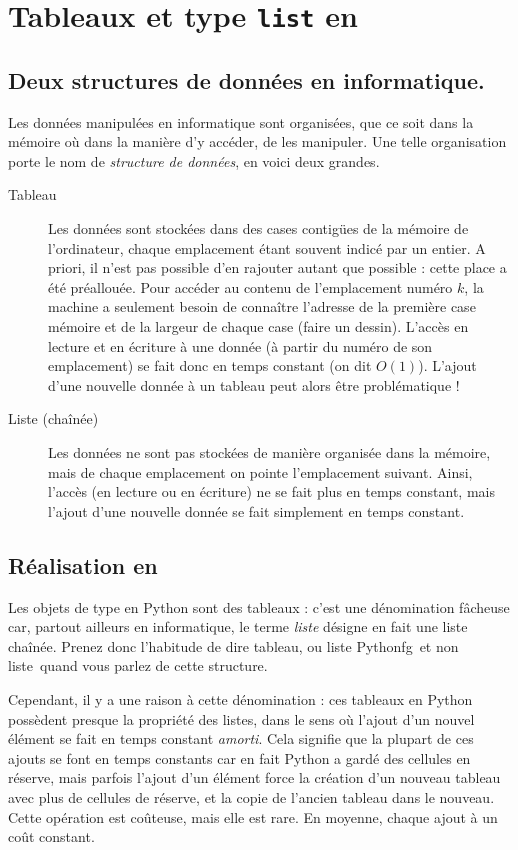 
\section{Tableaux et type \texttt{list} en \python}

\subsection{Deux structures de données en informatique.}

Les données manipulées en informatique sont organisées, que ce soit dans la mémoire où dans la manière d'y accéder, de les manipuler. 
Une telle organisation porte le nom de \emph{structure de données}, en voici deux grandes.  

\begin{description}
  \item[Tableau] Les données sont stockées dans des cases contigües de la mémoire de l'ordinateur, chaque emplacement étant souvent indicé par un entier. 
    A priori, il n'est pas possible d'en rajouter autant que possible : cette place a été préallouée. 
    Pour accéder au contenu de l'emplacement numéro $k$, la machine a seulement besoin de connaître 
l'adresse de la première case mémoire et de la largeur de chaque case (faire un dessin). 
    L'accès en lecture et en écriture à une donnée (à partir du numéro de son emplacement) se fait donc en temps constant (on dit $O(1)$).
    L'ajout d'une nouvelle donnée à un tableau peut alors être problématique !
  \item[Liste (chaînée)] Les données ne sont pas stockées de manière organisée dans la mémoire, 
mais de chaque emplacement on pointe l'emplacement suivant. 
    Ainsi, l'accès (en lecture ou en écriture) ne se fait plus en temps constant, mais l'ajout d'une nouvelle donnée se fait simplement en temps constant. 
\end{description}

\subsection{Réalisation en \python}

Les objets de type  en Python sont des tableaux : c'est une 
dénomination fâcheuse car, partout ailleurs en informatique, le terme
\emph{liste} désigne en fait une liste chaînée. Prenez donc
l'habitude de dire \og tableau\fg, ou \og liste Pythonfg\ et non \og liste\fg\ quand vous parlez de cette
structure.

Cependant, il y a une raison à cette dénomination : ces tableaux en Python possèdent presque 
la propriété des listes, dans le sens où l'ajout d'un nouvel élément se fait en temps constant 
\emph{amorti}. Cela signifie que la plupart de ces ajouts se font en temps constants car en fait 
Python a \og gardé des cellules en réserve\fg, mais parfois l'ajout d'un élément force la création 
d'un nouveau tableau avec plus de cellules de réserve, et la copie de l'ancien tableau dans le 
nouveau. Cette opération est coûteuse, mais elle 
est rare. En moyenne, chaque ajout à un coût constant.

